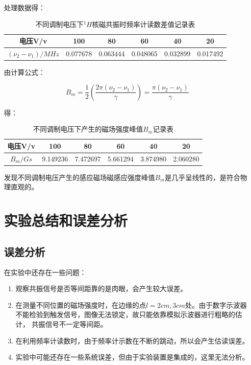 \documentclass[a4paper,UTF8]{ctexart}
\begin{document}
处理数据得：

\begin{table}[H]
    \centering
    \begin{tabular}{|c|c|c|c|c|c|}
    \hline
        电压V/v & 100 & 80 & 60 & 40 & 20 \\ \hline
        $(\nu_2-\nu_1) /MHz$ & 0.077678 & 0.063444 & 0.048065 & 0.032899 & 0.017492 \\ \hline
    \end{tabular}
    \caption{不同调制电压下$^1H$核磁共振时频率计读数差值记录表}
\end{table}

由计算公式：

\begin{equation}
    B_m = \frac{1}{2}(\frac{2\pi (\nu_2-\nu_1)}{\gamma}) = \frac{\pi (\nu_2-\nu_1)}{\gamma}
\end{equation}

得：

\begin{table}[H]
    \centering
    \begin{tabular}{|c|c|c|c|c|c|}
    \hline
        电压V/v & 100 & 80 & 60 & 40 & 20 \\ \hline
        $B_m/Gs$ & 9.149236 & 7.472697 & 5.661294 & 3.874980 & 2.060280 \\ \hline
    \end{tabular}
    \caption{不同调制电压下产生的磁场强度峰值$B_m$记录表}
\end{table}

发现不同调制电压产生的感应磁场磁感应强度峰值$B_m$是几乎呈线性的，是符合物理直观的。

\section{实验总结和误差分析}

\subsection{误差分析}

在实验中还存在一些问题：

\begin{enumerate}
    \item 观察共振信号是否等间距靠的是肉眼，会产生较大误差。
    \item 在测量不同位置的磁场强度时，在边缘的点$l=2cm,3cm$处。由于数字示波器不能检验到触发信号，图像无法锁定，故只能依靠模拟示波器进行粗略的估计，
    共振信号不一定等间距。
    \item 在利用频率计读数时，由于频率计示数在不断的跳动，所以会产生估读误差。
    \item 实验中可能还存在一些系统误差，但由于实验装置是集成的，这里无法分析。
\end{enumerate}
\end{document}
